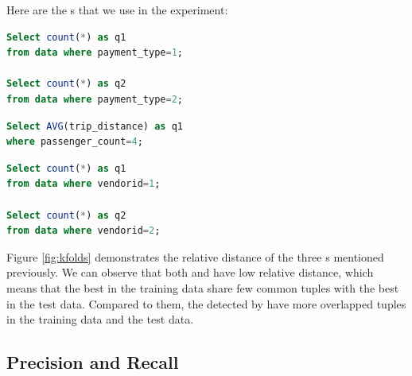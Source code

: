 

Here are the {\fact}s that we use in the experiment:
\renewcommand{\lstlistingname}{{Fact}}%
\begin{lstlisting}[language=SQL, caption=q1/q2, label=qry:o1]
Select count(*) as q1 
from data where payment_type=1;

Select count(*) as q2 
from data where payment_type=2;
\end{lstlisting}

\begin{lstlisting}[language=SQL, caption=q1, label=qry:o2]
Select AVG(trip_distance) as q1 
where passenger_count=4;
\end{lstlisting}

\begin{lstlisting}[language=SQL, caption=q1/q2, label=qry:o3]
Select count(*) as q1 
from data where vendorid=1;

Select count(*) as q2 
from data where vendorid=2;
\end{lstlisting}

Figure \ref{fig:kfolds} demonstrates the relative distance of the three {\fact}s mentioned previously. We can observe that both {\aggravation} and {\intervention} have low relative distance, which means that the best {\explanation} in the training data share few common tuples with the best {\explanation} in the test data. Compared to them, the {\explanation} detected by {\solution} have more overlapped tuples in the training data and the test data. 

\subsection{Precision and Recall}

